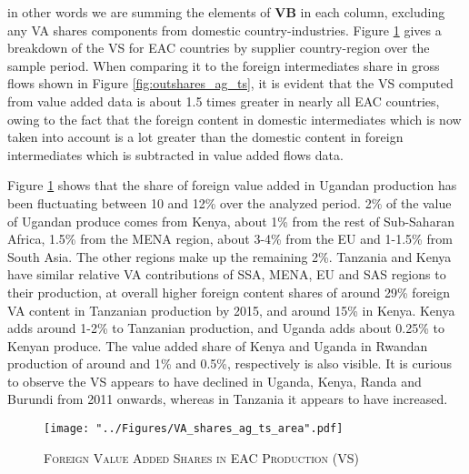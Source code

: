 \documentclass[a4paper]{article}
\begin{document}
in other words we are summing the elements of \textbf{VB} in each column, excluding any VA shares components from domestic country-industries. Figure \ref{fig:EACVB_ts} gives a breakdown of the VS for EAC countries by supplier country-region over the sample period. When comparing it to the foreign intermediates share in gross flows shown in Figure \ref{fig:outshares_ag_ts}, it is evident that the VS computed from value added data is about 1.5 times greater in nearly all EAC countries, owing to the fact that the foreign content in domestic intermediates which is now taken into account is a lot greater than the domestic content in foreign intermediates which is subtracted in value added flows data. \newline

Figure \ref{fig:EACVB_ts} shows that the share of foreign value added in Ugandan production has been fluctuating between 10 and 12\% over the analyzed period. 2\% of the value of Ugandan produce comes from Kenya, about 1\% from the rest of Sub-Saharan Africa, 1.5\% from the MENA region, about 3-4\% from the EU and 1-1.5\% from South Asia. The other regions make up the remaining 2\%. Tanzania and Kenya have similar relative VA contributions of SSA, MENA, EU and SAS regions to their production, at overall higher foreign content shares of around 29\% foreign VA content in Tanzanian production by 2015, and around 15\% in Kenya. Kenya adds around 1-2\% to Tanzanian production, and Uganda adds about 0.25\% to Kenyan produce. The value added share of Kenya and Uganda in Rwandan production of around and 1\% and 0.5\%, respectively is also visible. It is curious to observe the VS appears to have declined in Uganda, Kenya, Randa and Burundi from 2011 onwards, whereas in Tanzania it appears to have increased. %

\begin{figure}[h!]
\centering
\caption{\label{fig:EACVB_ts}\textsc{Foreign Value Added Shares in EAC Production (VS)}}
\texttt{[image: "../Figures/VA\_shares\_ag\_ts\_area".pdf]} %
\end{figure}
\FloatBarrier
\end{document}
